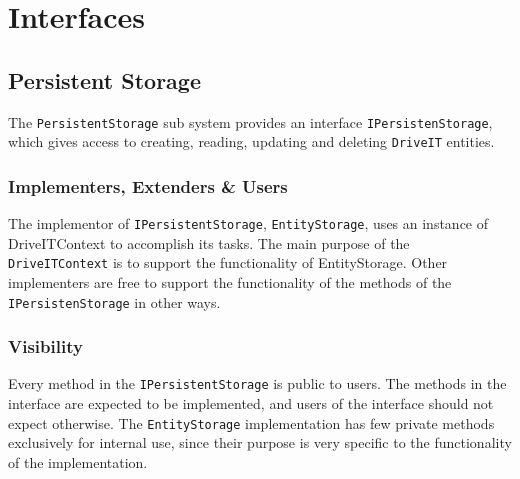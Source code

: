 \section{Interfaces}

\subsection{Persistent Storage}
The \texttt{PersistentStorage} sub system provides an interface \texttt{IPersistenStorage}, which gives access to creating, reading, updating and deleting \texttt{DriveIT} entities. 

\subsubsection{Implementers, Extenders \& Users}
The implementor of \texttt{IPersistentStorage}, \texttt{EntityStorage}, uses an instance of DriveITContext to accomplish its tasks. The main purpose of the \texttt{DriveITContext} is to support the functionality of EntityStorage. Other implementers are free to support the functionality of the methods of the \texttt{IPersistenStorage} in other ways. 

\subsubsection{Visibility}
Every method in the \texttt{IPersistentStorage} is public to users. The methods in the interface are expected to be implemented, and users of the interface should not expect otherwise.
The \texttt{EntityStorage} implementation has few private methods exclusively for internal use, since their purpose is very specific to the functionality of the implementation.
